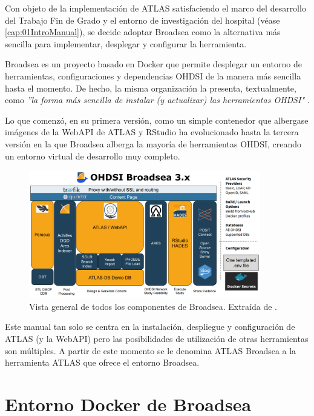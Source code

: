 Con objeto de la implementación de ATLAS satisfaciendo el marco del desarrollo del Trabajo Fin de Grado y el entorno de investigación del hospital (véase \ref{cap:01IntroManual}), se decide adoptar Broadsea como la alternativa más sencilla para implementar, desplegar y configurar la herramienta.

Broadsea es un proyecto basado en Docker que permite desplegar un entorno de herramientas, configuraciones y dependencias OHDSI de la manera más sencilla hasta el momento. De hecho, la misma organización la presenta, textualmente, como \textit{''la forma más sencilla de instalar (y actualizar) las herramientas OHDSI"} \cite{Broadsea3PDF}. 

Lo que comenzó, en su primera versión, como un simple contenedor que albergase imágenes de la WebAPI de ATLAS y RStudio \cite{Broadsea3PPTX} ha evolucionado hasta la tercera versión en la que Broadsea alberga la mayoría de herramientas OHDSI, creando un entorno virtual de desarrollo muy completo.

\begin{figure}[H]
    \centering
    \includegraphics[width=0.90\textwidth]{figures/OHDSIBroadsea3.0.png}
    \caption{Vista general de todos los componentes de Broadsea. Extraída de \cite{Broadsea3PPTX}.}
    \label{fig:OHDSIBroadsea3.0}
\end{figure}

Este manual tan solo se centra en la instalación, despliegue y configuración de ATLAS (y la WebAPI) pero las posibilidades de utilización de otras herramientas son múltiples. A partir de este momento se le denomina ATLAS Broadsea a la herramienta ATLAS que ofrece el entorno Broadsea.


\section{Entorno Docker de Broadsea} \label{cap:01Docker}

